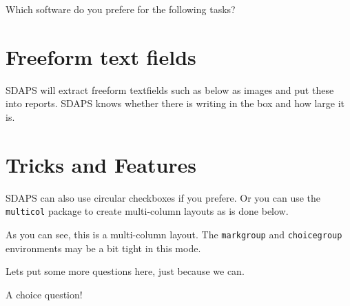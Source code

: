\documentclass[
  german,
  globalid=Inventionate,
  print_questionnaire_id,
  oneside,
  pagemark,
  stamp]{sdaps}
\newcommand{\seperate}[1][0.3]{\vspace{#1cm}\noindent\makebox[\linewidth]{\rule{\textwidth}{0.5pt}}\vspace{#1cm}}
\begin{document}
\begin{questionnaire}
    \seperate

    \begin{choicegroup}{Which software do you prefere for the following tasks?}
      \groupaddchoice{\LaTeX}

    \end{choicegroup}

    \section{Freeform text fields}

    SDAPS will extract freeform textfields such as below as images and put
    these into reports. SDAPS knows whether there is writing in the box and
    how large it is.


    \newpage
    \section{Tricks and Features}
    SDAPS can also use circular checkboxes if you prefere. Or you can use the
    {\tt multicol} package to create multi-column layouts as is done below.

    \def\checkboxstyle{ellipse}

    \begin{multicols}{2}
      \label{somelabel}

      As you can see, this is a multi-column layout. The {\tt markgroup} and
      {\tt choicegroup} environments may be a bit tight in this mode.

      Lets put some more questions here, just because we can.

      \begin{choicequestion}[1]{A choice question!}
      \end{choicequestion}


\end{multicols}
\end{questionnaire}
\end{document}
